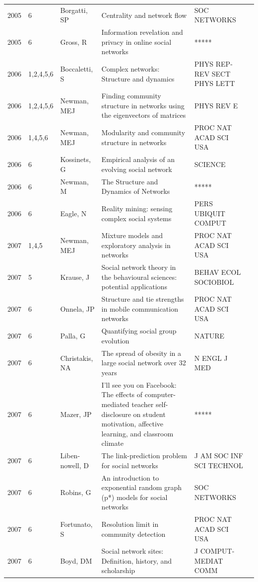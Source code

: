 \documentclass[11pt]{article} %
\begin{document}
\begin{longtable}{p{0.8cm}|p{1.25cm}|p{2.8cm}|p{7.5cm}|p{3cm}l}
2005&	6&	Borgatti, SP&	 Centrality and network flow&         	SOC NETWORKS\\
2005&	6&	Gross, R&	 Information revelation and privacy in online social networks&         	*****\\
2006&	1,2,4,5,6&	Boccaletti, S&	 Complex networks: Structure and dynamics&         	PHYS REP-REV SECT PHYS LETT\\
2006&	1,2,4,5,6&	Newman, MEJ&	 Finding community structure in networks using the eigenvectors of matrices&         	PHYS REV E\\
2006&	1,4,5,6&	Newman, MEJ&	 Modularity and community structure in networks&         	PROC NAT ACAD SCI USA\\
2006&	6&	Kossinets, G&	 Empirical analysis of an evolving social network&         	SCIENCE\\
2006&	6&	Newman, M &	 The Structure and Dynamics of Networks&         	*****\\
2006&	6&	Eagle, N&	 Reality mining: sensing complex social systems&         	PERS UBIQUIT COMPUT\\
2007&	1,4,5&	Newman, MEJ&	 Mixture models and exploratory analysis in networks&         	PROC NAT ACAD SCI USA\\
2007&	5&	Krause, J&	 Social network theory in the behavioural sciences: potential applications&         	BEHAV ECOL SOCIOBIOL\\
2007&	6&	Onnela, JP&	 Structure and tie strengths in mobile communication networks&         	PROC NAT ACAD SCI USA\\
2007&	6&	Palla, G&	 Quantifying social group evolution&         	NATURE\\
2007&	6&	Christakis, NA&	 The spread of obesity in a large social network over 32 years&         	N ENGL J MED\\
2007&	6&	Mazer, JP&	 I'll see you on Facebook: The effects of computer-mediated teacher self-disclosure on student motivation, affective learning, and classroom climate&         	*****\\
2007&	6&	Liben-nowell, D&	 The link-prediction problem for social networks&         	J AM SOC INF SCI TECHNOL\\
2007&	6&	Robins, G&	 An introduction to exponential random graph (p*) models for social networks&         	SOC NETWORKS\\
2007&	6&	Fortunato, S&	 Resolution limit in community detection&         	PROC NAT ACAD SCI USA\\
2007&	6&	Boyd, DM&	 Social network sites: Definition, history, and scholarship&         	J COMPUT-MEDIAT COMM\\

\end{longtable}
\end{document}
